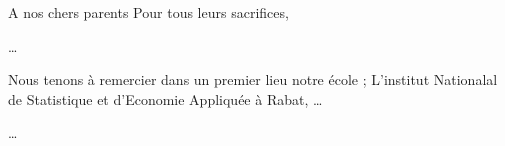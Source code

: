 \documentclass[../Main.tex]{subfiles}
\begin{document}
\begin{dedicace}

A nos chers parents Pour tous leurs sacrifices,\par
\dots
\end{dedicace}
\clearpage
\begin{acknowledgement}
    
\vspace*{2\baselineskip}

Nous tenons à remercier dans un premier lieu notre école ; L'institut Nationalal de Statistique et d'Economie Appliquée à Rabat, \dots\par
\dots

\end{acknowledgement}
\end{document}
